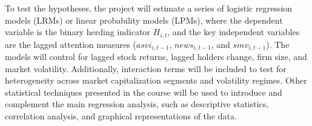 \documentclass[12pt]{article}
\begin{document}
To test the hypotheses, the project will estimate a series of logistic regression models (LRMs) or linear probability models (LPMs), where the dependent
variable is the binary herding indicator $H_{i,t}$, and the key independent variables are the lagged attention measures ($asvi_{i,t-1}$, $news_{i,t-1}$,
and $smv_{i,t-1}$). The models will control for lagged stock returns, lagged holders change, firm size, and market volatility. Additionally,
interaction terms will be included to test for heterogeneity across market capitalization segments and volatility regimes. Other statistical techniques presented in the course will be used to introduce and complement the main regression analysis, such as descriptive statistics,
correlation analysis, and graphical representations of the data.



\newpage
\printbibliography
\end{document}
